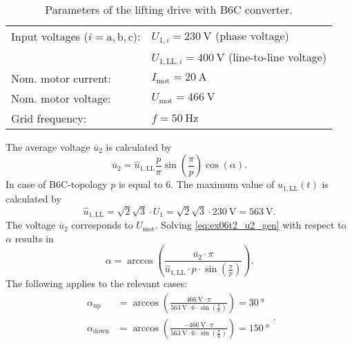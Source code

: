 \begin{table}[ht]
    \centering  %
    \begin{tabular}{ll}
        \toprule
        Input voltages ($i=\mathrm{a,b,c}$): & $U_{\mathrm{1},i}=\SI{230}{\volt}$ (phase voltage) \\
                        & $U_{\mathrm{1,LL},i} = \SI{400}{\volt}$ (line-to-line voltage)\\
        Nom. motor current: & $I_{\mathrm{mot}} = \SI{20}{\ampere}$ \\
        Nom. motor voltage: & $U_\mathrm{mot} = \SI{466}{\volt}$ \\ 
        Grid frequency: & $f= \SI{50}{\hertz}$ \\ 
        \bottomrule
    \end{tabular}
    \caption{Parameters of the lifting drive with B6C converter.}  
    \label{table:ex06_Task2_ParametersOfTheCircuit}
\end{table}


\begin{solutionblock}
    The average voltage $\overline{u}_\mathrm{2}$ is calculated by
    \begin{equation} 
        \overline{u}_\mathrm{2} = \hat{u}_\mathrm{1,LL} \frac{p}{\pi}\sin(\frac{\pi}{p}) \cos(\alpha).
        \label{eq:ex06t2_u2_gen}
    \end{equation}
    In case of B6C-topology $p$ is equal to 6. The maximum value of $u_\mathrm{1,LL}(t)$ is calculated by
    \begin{equation} 
        \hat{u}_\mathrm{1,LL}=\sqrt{2} \sqrt{3} \cdot U_\mathrm{1}= \sqrt{2} \sqrt{3} \cdot \SI{230}{\volt}=\SI{563}{\volt}.
        \label{eq:ex06t2_u1n_max}
    \end{equation}
    The voltage $\overline{u}_\mathrm{2}$ corresponds to $U_\mathrm{mot}$. Solving \eqref{eq:ex06t2_u2_gen} with respect to $\alpha$ results in
    \begin{equation} 
        \alpha = \arccos( \frac{\overline{u}_\mathrm{2} \cdot \pi}{\hat{u}_\mathrm{1,LL}\cdot p \cdot  \sin(\frac{\pi}{p})}).
    \end{equation}
    The following applies to the relevant cases:
    \begin{equation}     
        \begin{split}
            \alpha_\mathrm{up} &= \arccos( \frac{\SI{466}{\volt} \cdot \pi}{\SI{563}{\volt}\cdot 6 \cdot \sin(\frac{\pi}{6})})=\SI{30}{\degree} \\
            \alpha_\mathrm{down} &= \arccos( \frac{\SI{-466}{\volt} \cdot \pi}{\SI{563}{\volt}\cdot 6 \cdot \sin(\frac{\pi}{6})})=\SI{150}{\degree} \\
        \end{split}.
        \label{eq:ex06t2_alpha_gen}
    \end{equation}
\end{solutionblock}

